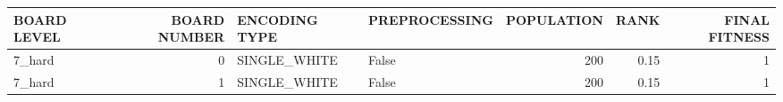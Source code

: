 \begin{tabular}{lrllrrr}
\hline
 BOARD LEVEL   &   BOARD NUMBER & ENCODING TYPE   & PREPROCESSING   &   POPULATION &   RANK &   FINAL FITNESS \\
\hline
 7\_hard        &              0 & SINGLE\_WHITE    & False           &          200 &   0.15 &               1 \\
 7\_hard        &              1 & SINGLE\_WHITE    & False           &          200 &   0.15 &               1 \\
\hline
\end{tabular}